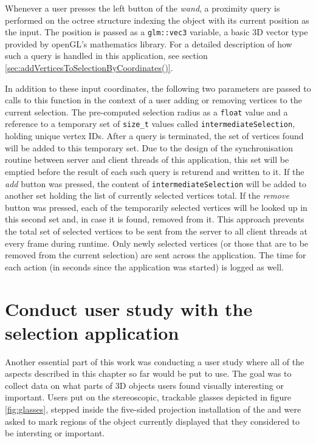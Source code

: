 Whenever a user presses the left button of the \textit{wand}, a proximity query is performed on the octree structure indexing the object with its current position as the input. The position is passed as a \texttt{glm::vec3} variable, a basic 3D vector type provided by openGL's mathematics library. For a detailed description of how such a query is handled in this application, see section \ref{sec:addVerticesToSelectionByCoordinates()}.

In addition to these input coordinates, the following two parameters are passed to calls to this function in the context of a user adding or removing vertices to the current selection. The pre-computed selection radius as a \texttt{float} value and a reference to a temporary set of \texttt{size\_t} values called \texttt{intermediateSelection}, holding unique vertex IDs. After a query is terminated, the set of vertices found will be added to this temporary set.
Due to the design of the synchronisation routine between server and client threads of this application, this set will be emptied before the result of each such query is returend and written to it. If the \textit{add} button was pressed, the content of \texttt{intermediateSelection} will be added to another set holding the list of currently selected vertices total. If the \textit{remove} button was pressed, each of the temporarily selected vertices will be looked up in this second set and, in case it is found, removed from it. This approach prevents the total set of selected vertices to be sent from the server to all client threads at every frame during runtime. Only newly selected vertices (or those that are to be removed from the current selection) are sent across the application. The time for each action (in seconds since the application was started) is logged as well. 

	\section {Conduct user study with the selection application}
	\label{sec:conduct_user_study_with_the_selection_application}
Another essential part of this work was conducting a user study where all of the aspects described in this chapter so far would be put to use. The goal was to collect data on what parts of 3D objects users found visually interesting or important. Users put on the stereoscopic, trackable glasses depicted in figure \ref{fig:glasses}, stepped inside the five-sided projection installation of the \cite{v2c} and were asked to mark regions of the object currently displayed that they considered to be intersting or important.

